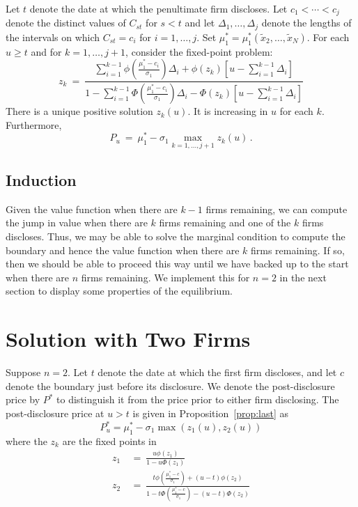 \documentclass[authoryear,letterpaper,english,12pt]{elsarticle}
\begin{document}
\begin{proposition}\label{prop:last}
Let $t$ denote the date at which the penultimate firm discloses.  Let $c_1< \cdots < c_j$ denote the distinct values of $C_{st}$ for $s<t$ and let $\Delta_1,\ldots, \Delta_j$ denote the lengths of the intervals on which $C_{st}=c_i$ for $i=1,\ldots,j$.
Set $\mu^*_1 = \mu^*_1(\tilde x_2,\ldots,\tilde x_N)$.  For each $u\ge t$ and for $k=1,\ldots, j+1$, consider the fixed-point problem:
\begin{equation}
z_k \ = \ \frac{\sum_{i=1}^{k-1} \phi\left(\frac{\mu^*_1-c_i}{\sigma_{1}}\right)\Delta_i + \phi(z_k)\left[u- \sum_{i=1}^{k-1}\Delta_i\right]}
{1 - \sum_{i=1}^{k-1} \Phi\left(\frac{\mu^*_{1}-c_i}{\sigma_{1}}\right)\Delta_i - \Phi(z_k)\left[u- \sum_{i=1}^{k-1}\Delta_i\right]}
\end{equation} 
There is a unique positive solution $z_k(u)$.  It is increasing in $u$ for each $k$.  Furthermore, 
\begin{equation}
P_u  \ = \ \mu_1^* - \sigma_1 \max_{k=1,\ldots,j+1}z_k(u)\,.
\end{equation}
\end{proposition}

\subsection{Induction}

Given the value function when there are $k-1$ firms remaining, we can compute the jump in value when there are $k$ firms remaining and one of the $k$ firms discloses.  Thus, we may be able to solve the marginal condition to compute the boundary and hence the value function when there are $k$ firms remaining.  If so, then we should be able to proceed this way until we have backed up to the start when there are $n$ firms remaining.  We implement this for $n=2$ in the next section to display some properties of the equilibrium.  

\section{Solution with Two Firms}

Suppose $n=2$.  Let $t$ denote the date at which the first firm discloses, and let $c$ denote the boundary just before its disclosure.  We denote the post-disclosure price by $P^*$ to distinguish it from the price prior to either firm disclosing.  The post-disclosure price at $u>t$ is given in Proposition~\ref{prop:last} as
\begin{equation}\label{price:last}
    P^*_u = \mu_1^* - \sigma_1 \max(z_1(u), z_2(u))
\end{equation}
where the $z_k$ are the fixed points in
\begin{align}
z_1 \ &= \ \frac{u\phi(z_1)}{1 - u\Phi(z_1)}\\
z_2 \ &= \ \frac{ t\phi\left(\frac{\mu^*_1-c}{\sigma_{1}}\right)+ (u-t)\phi(z_2)}
{1 - t\Phi\left(\frac{\mu^*_{1}-c}{\sigma_{1}}\right) - (u-t)\Phi(z_2)}
\end{align}
\end{document}
